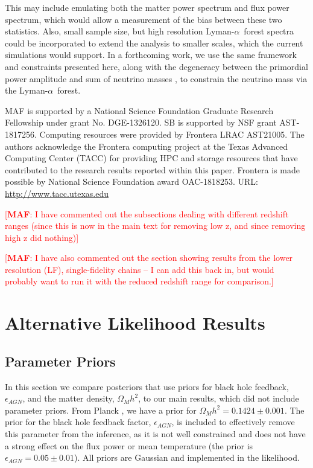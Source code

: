 \documentclass[a4paper,11pt]{article}
\newcommand{\lya}{Lyman-$\alpha$\ }
\newcommand{\maf}[1]{{\textcolor{red}{[{\bf MAF}: #1]}}}
\begin{document}
This may include emulating both the matter power spectrum and flux power spectrum, which would allow a measurement of the bias between these two statistics.
Also, small sample size, but high resolution \lya forest spectra could be incorporated to extend the analysis to smaller scales, which the current simulations would support.
In a forthcoming work, we use the same framework and constraints presented here, along with the degeneracy between the primordial power amplitude and sum of neutrino masses \cite{2020JCAP...04..025P}, to constrain the neutrino mass via the \lya forest.

\acknowledgments
MAF is supported by a National Science Foundation Graduate Research Fellowship under grant No. DGE-1326120.
SB is supported by NSF grant AST-1817256.
Computing resources were provided by Frontera LRAC AST21005.
The authors acknowledge the Frontera computing project at the Texas Advanced Computing Center (TACC) for providing HPC and storage resources that have contributed to the research results reported within this paper.
Frontera is made possible by National Science Foundation award OAC-1818253.
URL: \url{http://www.tacc.utexas.edu}

\appendix

\maf{I have commented out the subsections dealing with different redshift ranges (since this is now in the  main text for removing low z, and since removing high z did nothing)}

\maf{I have also commented out the section showing results from the lower resolution (LF), single-fidelity chains -- I can add this back in, but would probably want to run it with the reduced redshift range for comparison.}

\section{Alternative Likelihood Results}\label{sec:alt_results}

\subsection{Parameter Priors}\label{sec:priors}

In this section we compare posteriors that use priors for black hole feedback, $\epsilon_{AGN}$, and the matter density, $\Omega_M h^2$, to our main results, which did not include parameter priors.
From Planck \cite{2020A&A...641A...6P}, we have a prior for $\Omega_M h^2=0.1424\pm0.001$.
The prior for the black hole feedback factor, $\epsilon_{AGN}$, is included to effectively remove this parameter from the inference, as it is not well constrained and does not have a strong effect on the flux power or mean temperature (the prior is $\epsilon_{AGN} = 0.05 \pm 0.01$).
All priors are Gaussian and implemented in the likelihood.
\end{document}
